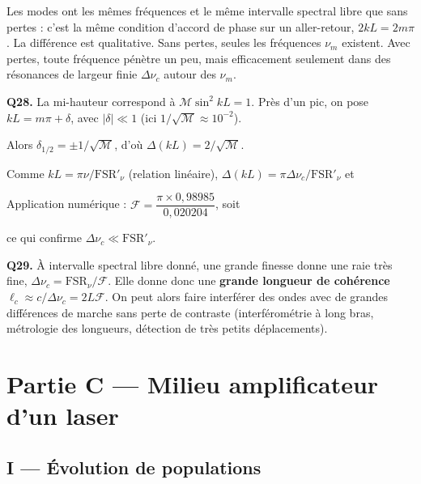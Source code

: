 \documentclass[11pt,a4paper]{article}
\newcommand{\equationajustee}[1]{%
  \sbox{\boiteequation}{$\displaystyle #1$}%
  \ifdim\wd\boiteequation>\linewidth
    \[\resizebox{\linewidth}{!}{\usebox{\boiteequation}}\]%
  \else
    \[#1\]%
  \fi}
\begin{document}
Les modes ont les mêmes fréquences et le même intervalle spectral libre que sans pertes : c'est la même condition d'accord de phase sur un aller-retour, \(2kL=2m\pi\). La différence est qualitative. Sans pertes, seules les fréquences \(\nu_m\) existent. Avec pertes, toute fréquence pénètre un peu, mais efficacement seulement dans des résonances de largeur finie \(\Delta\nu_c\) autour des \(\nu_m\).

\textbf{Q28.} La mi-hauteur correspond à \(\mathcal M\sin^2kL=1\). Près d'un pic, on pose \(kL=m\pi+\delta\), avec \(\lvert\delta\rvert\ll1\) (ici \(1/\sqrt{\mathcal M}\approx10^{-2}\)).

Alors \(\delta_{1/2}=\pm1/\sqrt{\mathcal M}\), d'où \(\Delta(kL)=2/\sqrt{\mathcal M}\).

Comme \(kL=\pi\nu/\mathrm{FSR}'_\nu\) (relation linéaire), \(\Delta(kL)=\pi\Delta\nu_c/\mathrm{FSR}'_\nu\) et

\equationajustee{\boxed{\begin{aligned}
\mathcal F&=\frac{\pi}{\Delta(kL)}\\
&=\frac{\pi\sqrt{\mathcal M}}{2}\\
&=\frac{\pi R^{1/4}}{1-\sqrt R}
\end{aligned}}}

Application numérique : \(\mathcal F=\dfrac{\pi\times0{,}98985}{0{,}020204}\), soit

\equationajustee{\boxed{\mathcal F\approx1{,}54\times10^{2}}}

ce qui confirme \(\Delta\nu_c\ll\mathrm{FSR}'_\nu\).

\textbf{Q29.} À intervalle spectral libre donné, une grande finesse donne une raie très fine, \(\Delta\nu_c={\mathrm{FSR}}_\nu/\mathcal F\). Elle donne donc une \textbf{grande longueur de cohérence} \(\ell_c\approx c/\Delta\nu_c=2L\mathcal F\). On peut alors faire interférer des ondes avec de grandes différences de marche sans perte de contraste (interférométrie à long bras, métrologie des longueurs, détection de très petits déplacements).

\hypertarget{partie-c-milieu-amplificateur-dun-laser}{%
\section{Partie C --- Milieu amplificateur d'un laser}\label{partie-c-milieu-amplificateur-dun-laser}}

\hypertarget{i-uxe9volution-de-populations}{%
\subsection{I --- Évolution de populations}\label{i-uxe9volution-de-populations}}
\end{document}
